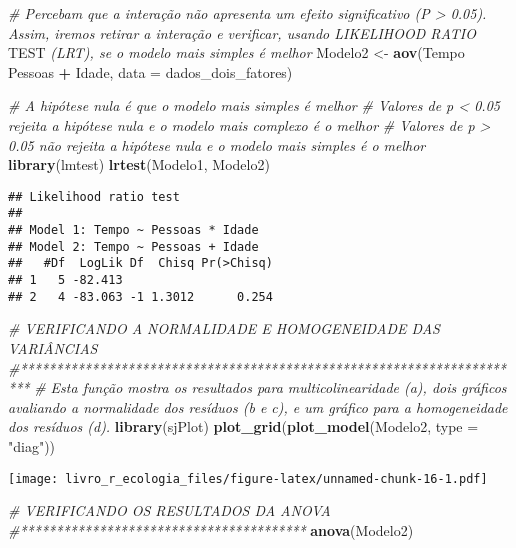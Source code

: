 \documentclass[
]{book}
\newenvironment{Shaded}{\begin{snugshade}}{\end{snugshade}}
\newcommand{\AlertTok}[1]{\textcolor[rgb]{0.94,0.16,0.16}{#1}}
\newcommand{\CommentTok}[1]{\textcolor[rgb]{0.56,0.35,0.01}{\textit{#1}}}
\newcommand{\DataTypeTok}[1]{\textcolor[rgb]{0.13,0.29,0.53}{#1}}
\newcommand{\KeywordTok}[1]{\textcolor[rgb]{0.13,0.29,0.53}{\textbf{#1}}}
\newcommand{\NormalTok}[1]{#1}
\newcommand{\OperatorTok}[1]{\textcolor[rgb]{0.81,0.36,0.00}{\textbf{#1}}}
\newcommand{\StringTok}[1]{\textcolor[rgb]{0.31,0.60,0.02}{#1}}
\begin{document}
\begin{Shaded}
\begin{Highlighting}[]
\CommentTok{# Percebam que a interação não apresenta um efeito significativo (P > 0.05). Assim, iremos retirar a interação e verificar, usando LIKELIHOOD RATIO }\AlertTok{TEST}\CommentTok{ (LRT), se o modelo mais simples é melhor }
\NormalTok{Modelo2 <-}\StringTok{ }\KeywordTok{aov}\NormalTok{(Tempo }\OperatorTok{~}\StringTok{ }\NormalTok{Pessoas }\OperatorTok{+}\StringTok{ }\NormalTok{Idade, }\DataTypeTok{data =}\NormalTok{ dados_dois_fatores) }

\CommentTok{# A hipótese nula é que o modelo mais simples é melhor}
\CommentTok{# Valores de p < 0.05 rejeita a hipótese nula e o modelo mais complexo é o melhor}
\CommentTok{# Valores de p > 0.05 não rejeita a hipótese nula e o modelo mais simples é o melhor}
\KeywordTok{library}\NormalTok{(lmtest)}
\KeywordTok{lrtest}\NormalTok{(Modelo1, Modelo2)}
\end{Highlighting}
\end{Shaded}

\begin{verbatim}
## Likelihood ratio test
## 
## Model 1: Tempo ~ Pessoas * Idade
## Model 2: Tempo ~ Pessoas + Idade
##   #Df  LogLik Df  Chisq Pr(>Chisq)
## 1   5 -82.413                     
## 2   4 -83.063 -1 1.3012      0.254
\end{verbatim}

\begin{Shaded}
\begin{Highlighting}[]
\CommentTok{# VERIFICANDO A NORMALIDADE E HOMOGENEIDADE DAS VARIÂNCIAS}
\CommentTok{#***********************************************************************}
\CommentTok{# Esta função mostra os resultados para multicolinearidade (a), dois gráficos avaliando a normalidade dos resíduos (b e  c), e um gráfico para a homogeneidade dos resíduos (d).}
\KeywordTok{library}\NormalTok{(sjPlot)}
\KeywordTok{plot_grid}\NormalTok{(}\KeywordTok{plot_model}\NormalTok{(Modelo2, }\DataTypeTok{type =} \StringTok{"diag"}\NormalTok{))}
\end{Highlighting}
\end{Shaded}

\texttt{[image: livro\_r\_ecologia\_files/figure-latex/unnamed-chunk-16-1.pdf]}

\begin{Shaded}
\begin{Highlighting}[]
\CommentTok{# VERIFICANDO OS RESULTADOS DA ANOVA}
\CommentTok{#****************************************}
\KeywordTok{anova}\NormalTok{(Modelo2)}
\end{Highlighting}
\end{Shaded}
\end{document}
